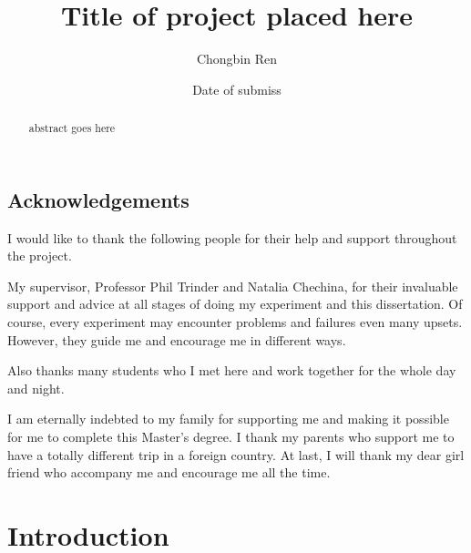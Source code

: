 \documentclass{mproj}
\begin{document}
\sloppy
\title{Title of project placed here}
\author{Chongbin Ren}
\date{Date of submiss}
\maketitle

\begin{abstract}
abstract goes here
\end{abstract}

\educationalconsent


\newpage
\section*{Acknowledgements}

I would like to thank the following people for their help and support throughout the project.

My supervisor, Professor Phil Trinder and Natalia Chechina, for their invaluable support and advice at all stages of doing my experiment and this dissertation. Of course, every experiment may encounter problems and failures even many upsets. However, they guide me and encourage me in different ways.

Also thanks many students who I met here and work together for the whole day and night.

I am eternally indebted to my family for supporting me and making it possible for me to complete this Master’s degree. I thank my parents who support me to have a totally different trip in a foreign country. At last, I will thank my dear girl friend who accompany me and encourage me all the time.

\tableofcontents

\chapter{Introduction}\label{intro}
\end{document}
